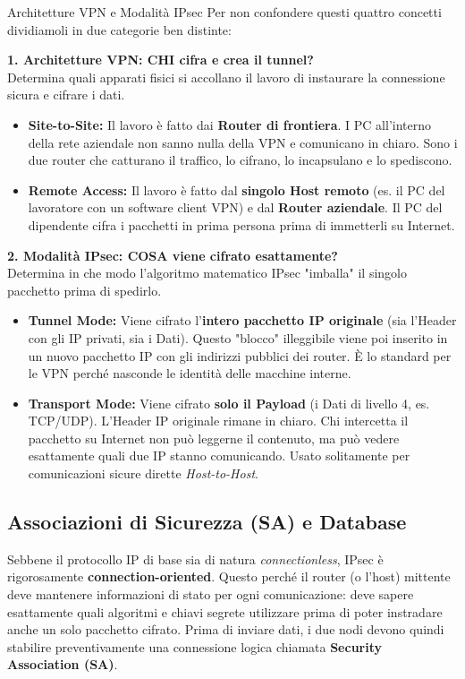 \documentclass[a4paper,12pt]{report}
\begin{document}
\begin{notebox}{Architetture VPN e Modalità IPsec}
Per non confondere questi quattro concetti dividiamoli in due categorie ben distinte: 

\vspace{0.2cm}
\textbf{1. Architetture VPN: CHI cifra e crea il tunnel?} \\
Determina quali apparati fisici si accollano il lavoro  di instaurare la connessione sicura e cifrare i dati.
\begin{itemize}[leftmargin=*]
    \item \textbf{Site-to-Site:} Il lavoro è fatto dai \textbf{Router di frontiera}. I PC all'interno della rete aziendale non sanno nulla della VPN e comunicano in chiaro. Sono i due router che catturano il traffico, lo cifrano, lo incapsulano e lo spediscono.
    \item \textbf{Remote Access:} Il lavoro è fatto dal \textbf{singolo Host remoto} (es. il PC del lavoratore con un software client VPN) e dal \textbf{Router aziendale}. Il PC del dipendente cifra i pacchetti in prima persona prima di immetterli su Internet.
\end{itemize}

\vspace{0.2cm}
\textbf{2. Modalità IPsec: COSA viene cifrato esattamente?} \\
Determina in che modo l'algoritmo matematico IPsec "imballa" il singolo pacchetto prima di spedirlo.
\begin{itemize}[leftmargin=*]
    \item \textbf{Tunnel Mode:} Viene cifrato l'\textbf{intero pacchetto IP originale} (sia l'Header con gli IP privati, sia i Dati). Questo "blocco" illeggibile viene poi inserito in un nuovo pacchetto IP con gli indirizzi pubblici dei router. È lo standard per le VPN perché nasconde le identità delle macchine interne.
    \item \textbf{Transport Mode:} Viene cifrato \textbf{solo il Payload} (i Dati di livello 4, es. TCP/UDP). L'Header IP originale rimane in chiaro. Chi intercetta il pacchetto su Internet non può leggerne il contenuto, ma può vedere esattamente quali due IP stanno comunicando. Usato solitamente per comunicazioni sicure dirette \textit{Host-to-Host}.
\end{itemize}
\end{notebox}


\newpage
\subsection{Associazioni di Sicurezza (SA) e Database}
Sebbene il protocollo IP di base sia di natura \textit{connectionless}, IPsec è rigorosamente \textbf{connection-oriented}. Questo perché il router (o l'host) mittente deve mantenere informazioni di stato per ogni comunicazione: deve sapere esattamente quali algoritmi e chiavi segrete utilizzare prima di poter instradare anche un solo pacchetto cifrato. Prima di inviare dati, i due nodi devono quindi stabilire preventivamente una connessione logica chiamata \textbf{Security Association (SA)}.
\end{document}
